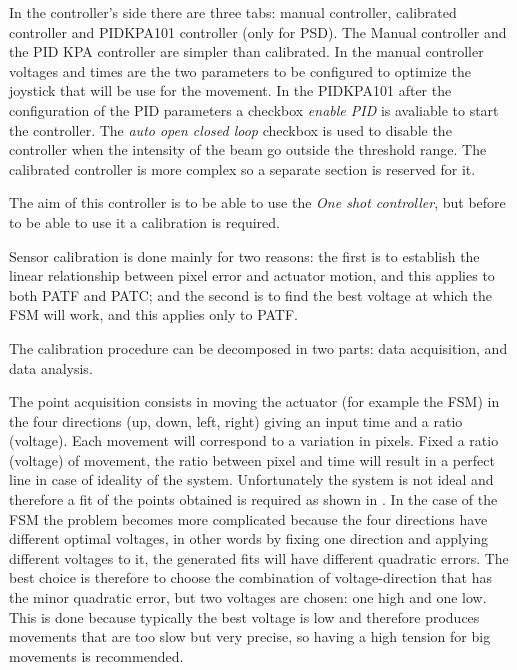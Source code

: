 In the controller's side there are three tabs: manual controller, calibrated
controller and PIDKPA101 controller (only for PSD).
The Manual controller and the PID KPA controller are simpler than calibrated.
In the manual controller voltages and times are the two parameters to be configured to optimize the joystick that will be use for the movement.
In the PIDKPA101 after the configuration of the PID parameters a checkbox \emph{enable PID}
is avaliable to start the controller. The \emph{auto open closed loop} checkbox is used to
disable the controller when the intensity of the beam go outside the
threshold range.
The calibrated controller is more complex so a separate section is reserved for it.



The aim of this controller is to be able to use the \emph{One shot controller}, but before to be able to use it a calibration is required.

Sensor calibration is done mainly for two reasons: the first is to establish the linear relationship between pixel error and actuator motion, and this applies to both PATF and PATC; and the second is to find the best voltage at which the FSM will work, and this applies only to PATF.

The calibration procedure can be decomposed in two parts:
data acquisition, and data analysis.

The point acquisition consists in moving the actuator (for example the FSM) in the four directions (up, down, left, right) giving an input time and a ratio (voltage). Each movement will correspond to a variation in pixels.
Fixed a ratio (voltage) of movement, the ratio between pixel and time will result in a perfect line in case of ideality of the system. Unfortunately the system is not ideal and therefore a fit of the points obtained is required as shown in .
In the case of the FSM the problem becomes more complicated because the four directions have different optimal voltages, in other words by fixing one direction and applying different voltages to it, the generated fits will have different quadratic errors.
The best choice is therefore to choose the combination of voltage-direction that has the minor quadratic error, but two voltages are chosen: one high and one low. This is done because typically the best voltage is low and therefore produces movements that are too slow but very precise, so having a high tension for big movements is recommended.

